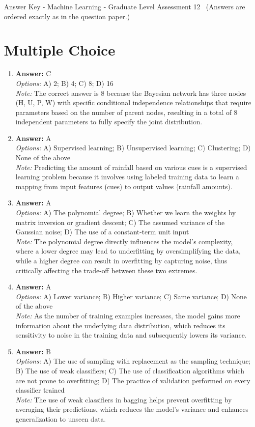 \documentclass[12pt]{article}
\begin{document}
\begin{center}
Answer Key - Machine Learning - Graduate Level Assessment 12 \
\small (Answers are ordered exactly as in the question paper.)
\end{center}

\section*{Multiple Choice}
\begin{enumerate}[label=\arabic*.]
\item \textbf{Answer:} C
\\ \textit{Options:} A) 2; B) 4; C) 8; D) 16
\\ \textit{Note:} The correct answer is 8 because the Bayesian network has three nodes (H, U, P, W) with specific conditional independence relationships that require parameters based on the number of parent nodes, resulting in a total of 8 independent parameters to fully specify the joint distribution.
\item \textbf{Answer:} A
\\ \textit{Options:} A) Supervised learning; B) Unsupervised learning; C) Clustering; D) None of the above
\\ \textit{Note:} Predicting the amount of rainfall based on various cues is a supervised learning problem because it involves using labeled training data to learn a mapping from input features (cues) to output values (rainfall amounts).
\item \textbf{Answer:} A
\\ \textit{Options:} A) The polynomial degree; B) Whether we learn the weights by matrix inversion or gradient descent; C) The assumed variance of the Gaussian noise; D) The use of a constant-term unit input
\\ \textit{Note:} The polynomial degree directly influences the model's complexity, where a lower degree may lead to underfitting by oversimplifying the data, while a higher degree can result in overfitting by capturing noise, thus critically affecting the trade-off between these two extremes.
\item \textbf{Answer:} A
\\ \textit{Options:} A) Lower variance; B) Higher variance; C) Same variance; D) None of the above
\\ \textit{Note:} As the number of training examples increases, the model gains more information about the underlying data distribution, which reduces its sensitivity to noise in the training data and subsequently lowers its variance.
\item \textbf{Answer:} B
\\ \textit{Options:} A) The use of sampling with replacement as the sampling technique; B) The use of weak classifiers; C) The use of classification algorithms which are not prone to overfitting; D) The practice of validation performed on every classifier trained
\\ \textit{Note:} The use of weak classifiers in bagging helps prevent overfitting by averaging their predictions, which reduces the model's variance and enhances generalization to unseen data.
\end{enumerate}
\end{document}
